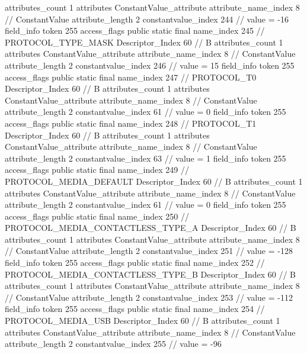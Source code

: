 {{{{{				attributes_count	1
				attributes {
				ConstantValue_attribute {
					attribute_name_index	8		// ConstantValue
					attribute_length	2
					constantvalue_index	244		// value = -16
				}
				}
			}
			field_info {
				token	255
				access_flags	public static final
				name_index	245		// PROTOCOL_TYPE_MASK
				Descriptor_Index	60		// B
				attributes_count	1
				attributes {
				ConstantValue_attribute {
					attribute_name_index	8		// ConstantValue
					attribute_length	2
					constantvalue_index	246		// value = 15
				}
				}
			}
			field_info {
				token	255
				access_flags	public static final
				name_index	247		// PROTOCOL_T0
				Descriptor_Index	60		// B
				attributes_count	1
				attributes {
				ConstantValue_attribute {
					attribute_name_index	8		// ConstantValue
					attribute_length	2
					constantvalue_index	61		// value = 0
				}
				}
			}
			field_info {
				token	255
				access_flags	public static final
				name_index	248		// PROTOCOL_T1
				Descriptor_Index	60		// B
				attributes_count	1
				attributes {
				ConstantValue_attribute {
					attribute_name_index	8		// ConstantValue
					attribute_length	2
					constantvalue_index	63		// value = 1
				}
				}
			}
			field_info {
				token	255
				access_flags	public static final
				name_index	249		// PROTOCOL_MEDIA_DEFAULT
				Descriptor_Index	60		// B
				attributes_count	1
				attributes {
				ConstantValue_attribute {
					attribute_name_index	8		// ConstantValue
					attribute_length	2
					constantvalue_index	61		// value = 0
				}
				}
			}
			field_info {
				token	255
				access_flags	public static final
				name_index	250		// PROTOCOL_MEDIA_CONTACTLESS_TYPE_A
				Descriptor_Index	60		// B
				attributes_count	1
				attributes {
				ConstantValue_attribute {
					attribute_name_index	8		// ConstantValue
					attribute_length	2
					constantvalue_index	251		// value = -128
				}
				}
			}
			field_info {
				token	255
				access_flags	public static final
				name_index	252		// PROTOCOL_MEDIA_CONTACTLESS_TYPE_B
				Descriptor_Index	60		// B
				attributes_count	1
				attributes {
				ConstantValue_attribute {
					attribute_name_index	8		// ConstantValue
					attribute_length	2
					constantvalue_index	253		// value = -112
				}
				}
			}
			field_info {
				token	255
				access_flags	public static final
				name_index	254		// PROTOCOL_MEDIA_USB
				Descriptor_Index	60		// B
				attributes_count	1
				attributes {
				ConstantValue_attribute {
					attribute_name_index	8		// ConstantValue
					attribute_length	2
					constantvalue_index	255		// value = -96
				}
				}
			}
}}}}
